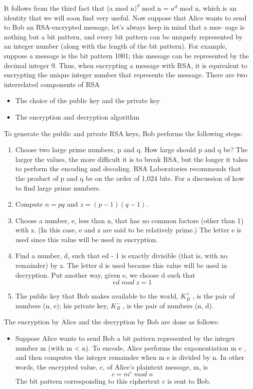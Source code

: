\documentclass{report}
\theoremstyle{definition}
\begin{document}
{{{\Large{It follows from the third fact that (a mod n$)^d$ mod n = $a^d$ mod n, which is an identity
that we will soon find very useful.
Now suppose that Alice wants to send to Bob an RSA-encrypted message, let’s always keep in mind that a mes-
sage is nothing but a bit pattern, and every bit pattern can be uniquely represented by
an integer number (along with the length of the bit pattern). For example, suppose
a message is the bit pattern 1001; this message can be represented by the decimal
integer 9. Thus, when encrypting a message with RSA, it is equivalent to encrypting
the unique integer number that represents the message.
There are two interrelated components of RSA
\begin{itemize}
\item{The choice of the public key and the private key}
\item{The encryption and decryption algorithm}
\end{itemize}
To generate the public and private RSA keys, Bob performs the following steps:
\begin{enumerate}
\item{Choose two large prime numbers, p and q. How large should p and q be? The
larger the values, the more difficult it is to break RSA, but the longer it takes to perform the encoding and decoding. RSA Laboratories recommends that
the product of p and q be on the order of 1,024 bits. For a discussion of how to
find large prime numbers.}
\item{Compute $n = pq$ and $z = (p - 1)(q - 1)$.}
\item{Choose a number, e, less than n, that has no common factors (other than 1)
with z. (In this case, e and z are said to be relatively prime.) The letter e is used
since this value will be used in encryption.}
\item{Find a number, d, such that ed - 1 is exactly divisible (that is, with no remainder)
by z. The letter d is used because this value will be used in decryption. Put another
way, given e, we choose d such that
$$ed\;mod\;z = 1$$}
\item{The public key that Bob makes available to the world, $K_B^+$ , is the pair of numbers
(n, e); his private key, $K_B^-$ , is the pair of numbers (n, d).}
\end{enumerate}

The encryption by Alice and the decryption by Bob are done as follows:
\begin{itemize}
\item{Suppose Alice wants to send Bob a bit pattern represented by the integer number
m (with m < n). To encode, Alice performs the exponentiation m e , and then
computes the integer remainder when m e is divided by n. In other words, the
encrypted value, c, of Alice’s plaintext message, m, is
$$c=m^e\;mod\;n$$
The bit pattern corresponding to this ciphertext c is sent to Bob.}


\end{itemize}}}}}
\end{document}
